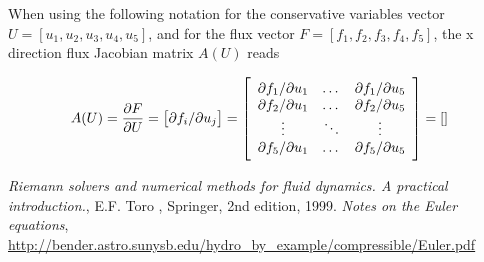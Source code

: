 \documentclass{article}
\begin{document}
When using the following notation for the conservative variables vector $U=[u_1, u_2, u_3, u_4, u_5]$, and for the flux vector $F=[f_1, f_2, f_3, f_4, f_5]$, the x direction flux Jacobian matrix $A(U)$ reads

\begin{equation}
  A(U)=\frac{\partial F}{\partial U} = \left[ \partial f_i/\partial u_j \right] = \left [
    \begin{array}{c c c}
      \partial f_1/\partial u_1 & \dots & \partial f_1/\partial u_5\\
      \partial f_2/\partial u_1 & \dots & \partial f_2/\partial u_5\\
      \vdots & \ddots & \vdots\\
      \partial f_5/\partial u_1 & \dots & \partial f_5/\partial u_5\\
    \end{array} \right ]
  = \left[
    \begin{array}{c c c c c}
      
    \end{array} \right ]
\end{equation}

\begin{thebibliography}{9}
 \emph{Riemann solvers and numerical methods for fluid dynamics. A practical introduction.}, E.F. Toro , Springer, 2nd edition, 1999.
 \emph{Notes on the Euler equations}, \url{http://bender.astro.sunysb.edu/hydro_by_example/compressible/Euler.pdf}
\end{thebibliography}
\end{document}
